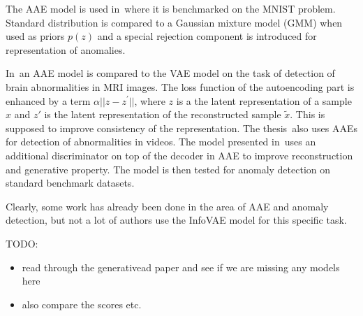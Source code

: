 The AAE model is used in\,\cite{leveau2017adversarial} where it
is benchmarked on the MNIST problem. Standard distribution is compared
to a Gaussian mixture model (GMM) when used as priors $p(z)$ and
a special rejection component is introduced for representation of
anomalies. 

In\,\cite{chen2018unsupervised} an AAE model is compared to the
VAE model on the task of detection of brain abnormalities in MRI images.
The loss function of the autoencoding part is enhanced by a term $\alpha||z-z^{\prime}||$,
where $z$ is a the latent representation of a sample $x$ and $z'$
is the latent representation of the reconstructed sample $\tilde{x}$.
This is supposed to improve consistency of the representation. The
thesis\,\cite{dimokranitou2017adversarial} also uses AAEs for detection
of abnormalities in videos. The model presented in\,\cite{pidhorskyi2018generative}
uses an additional discriminator on top of the decoder in AAE to improve
reconstruction and generative property. The model is then tested for
anomaly detection on standard benchmark datasets.

Clearly, some work has already been done in the area of AAE and anomaly
detection, but not a lot of authors use the InfoVAE model for this
specific task.


TODO:

\begin{itemize}
    \item read through the generativead paper and see if we are missing any models here
    \item also compare the scores etc.
\end{itemize}